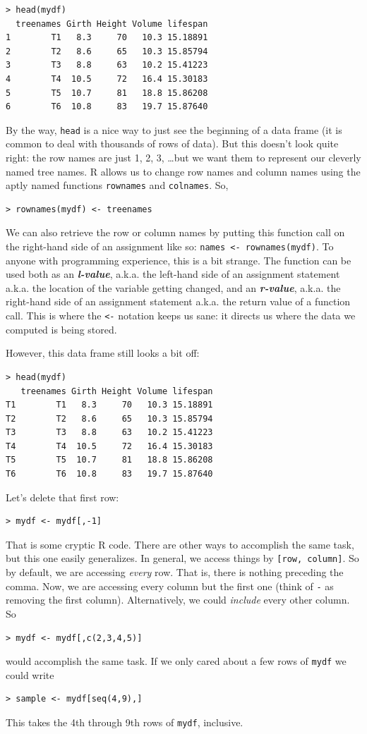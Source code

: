 \documentclass[12pt]{article}
\theoremstyle{remark}
\newcommand{\vocab}[1]{\textbf{\emph{#1}}}
\begin{document}
\begin{Verbatim}[frame=single, fontsize=\small]
> head(mydf)
  treenames Girth Height Volume lifespan
1        T1   8.3     70   10.3 15.18891
2        T2   8.6     65   10.3 15.85794
3        T3   8.8     63   10.2 15.41223
4        T4  10.5     72   16.4 15.30183
5        T5  10.7     81   18.8 15.86208
6        T6  10.8     83   19.7 15.87640
\end{Verbatim}
By the way, \verb|head| is a nice way to just see the beginning of a data frame (it is common to deal with thousands of rows of data). But this doesn't look quite right: the row names are just 1, 2, 3, \dots but we want them to represent our cleverly named tree names. R allows us to change row names and column names using the aptly named functions \verb|rownames| and \verb|colnames|. So,
\begin{verbatim}
> rownames(mydf) <- treenames
\end{verbatim}
We can also retrieve the row or column names by putting this function call on the right-hand side of an assignment like so: \verb|names <- rownames(mydf)|. To anyone with programming experience, this is a bit strange. The function can be used both as an \vocab{\emph{l}-value}, a.k.a. the left-hand side of an assignment statement a.k.a. the location of the variable getting changed, and an \vocab{\emph{r}-value}, a.k.a. the right-hand side of an assignment statement a.k.a. the return value of a function call. This is where the \verb|<-| notation keeps us sane: it directs us where the data we computed is being stored.

However, this data frame still looks a bit off:
\begin{Verbatim}[frame=single, fontsize=\small]
> head(mydf)
   treenames Girth Height Volume lifespan
T1        T1   8.3     70   10.3 15.18891
T2        T2   8.6     65   10.3 15.85794
T3        T3   8.8     63   10.2 15.41223
T4        T4  10.5     72   16.4 15.30183
T5        T5  10.7     81   18.8 15.86208
T6        T6  10.8     83   19.7 15.87640
\end{Verbatim}
Let's delete that first row:
\begin{verbatim}
> mydf <- mydf[,-1]
\end{verbatim}

That is some cryptic R code. There are other ways to accomplish the same task, but this one easily generalizes. In general, we access things by \verb|[row, column]|. So by default, we are accessing \emph{every} row. That is, there is nothing preceding the comma. Now, we are accessing every column but the first one (think of \verb|-| as removing the first column). Alternatively, we could \emph{include} every other column. So
\begin{verbatim}
> mydf <- mydf[,c(2,3,4,5)]
\end{verbatim}
would accomplish the same task. If we only cared about a few rows of \verb|mydf| we could write
\begin{verbatim}
> sample <- mydf[seq(4,9),]
\end{verbatim}
This takes the 4th through 9th rows of \verb|mydf|, inclusive.
\end{document}
